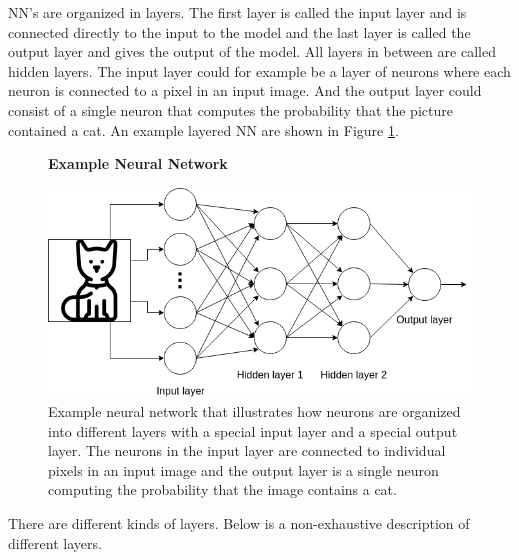 \gls{NN}'s are organized in layers. The first layer is called the input layer
and is connected directly to the input to the model and the last layer is called
the output layer and gives the output of the model. All layers in between are
called hidden layers. The input layer could for example be a layer of neurons
where each neuron is connected to a pixel in an input image. And the output
layer could consist of a single neuron that computes the probability that
the picture contained a cat. An example layered \gls{NN} are shown in Figure
\ref{fig:example_nn}.

\begin{figure}
    \centering
    \textbf{Example Neural Network}\par\medskip
    \includegraphics[width=\textwidth]{./pictures/method/example_neural_network.png}
    \caption{Example neural network that illustrates how neurons are organized
        into different layers with a special input layer and a special output
        layer. The neurons in the input layer are connected to individual pixels
        in an input image and the output layer is a single neuron computing the
        probability that the image contains a cat.}
    \label{fig:example_nn}
\end{figure}

There are different kinds of layers. Below is a non-exhaustive description of
different layers.

